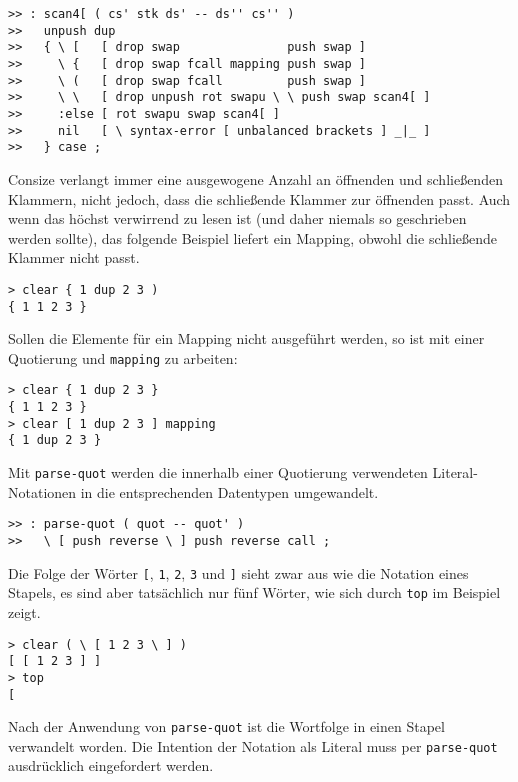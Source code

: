 \begin{verbatim}    
>> : scan4[ ( cs' stk ds' -- ds'' cs'' )
>>   unpush dup
>>   { \ [   [ drop swap               push swap ]
>>     \ {   [ drop swap fcall mapping push swap ]
>>     \ (   [ drop swap fcall         push swap ]
>>     \ \   [ drop unpush rot swapu \ \ push swap scan4[ ] 
>>     :else [ rot swapu swap scan4[ ]
>>     nil   [ \ syntax-error [ unbalanced brackets ] _|_ ]
>>   } case ;
\end{verbatim}

Consize verlangt immer eine ausgewogene Anzahl an öffnenden und schließenden Klammern, nicht jedoch, dass die schließende Klammer zur öff\-nen\-den passt. Auch wenn das höchst verwirrend zu lesen ist (und daher niemals so geschrieben werden sollte), das folgende Beispiel liefert ein Mapping, obwohl die schließende Klammer nicht passt.

\begin{verbatim}
> clear { 1 dup 2 3 )
{ 1 1 2 3 }
\end{verbatim}

Sollen die Elemente für ein Mapping nicht ausgeführt werden, so ist mit einer Quotierung und \verb|mapping| zu arbeiten:

\begin{verbatim}
> clear { 1 dup 2 3 }
{ 1 1 2 3 }
> clear [ 1 dup 2 3 ] mapping
{ 1 dup 2 3 }
\end{verbatim}

Mit \verb|parse-quot| werden die innerhalb einer Quotierung verwendeten Li\-te\-ral-Notationen in die entsprechenden Datentypen umgewandelt. 

\begin{verbatim}  
>> : parse-quot ( quot -- quot' )
>>   \ [ push reverse \ ] push reverse call ;
\end{verbatim}

Die Folge der Wörter \verb|[|, \verb|1|, \verb|2|, \verb|3| und \verb|]| sieht zwar aus wie die Notation eines Stapels, es sind aber tatsächlich nur fünf Wörter, wie sich durch \verb|top| im Beispiel zeigt.

\begin{verbatim}
> clear ( \ [ 1 2 3 \ ] )
[ [ 1 2 3 ] ]
> top
[
\end{verbatim}

Nach der Anwendung von \verb|parse-quot| ist die Wortfolge in einen Stapel verwandelt worden. Die Intention der Notation als Literal muss per \verb|parse-quot| ausdrücklich eingefordert werden.

